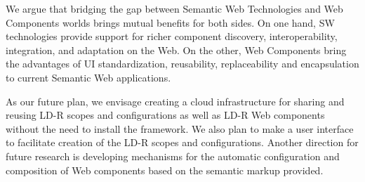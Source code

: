 \documentclass{llncs}
\begin{document}
We argue that bridging the gap between Semantic Web Technologies and Web Components worlds brings mutual benefits for both sides.
On one hand, SW technologies provide support for richer component discovery, interoperability, integration, and adaptation on the Web.
On the other, Web Components bring the advantages of UI standardization, reusability, replaceability and encapsulation to current Semantic Web applications.

As our future plan, we envisage creating a cloud infrastructure for sharing and reusing LD-R scopes and configurations as well as LD-R Web components without the need to install the framework.
We also plan to make a user interface to facilitate creation of the LD-R scopes and configurations.
Another direction for future research is developing mechanisms for the automatic configuration and composition of Web components based on the semantic markup provided.

%


\scriptsize

\end{document}
